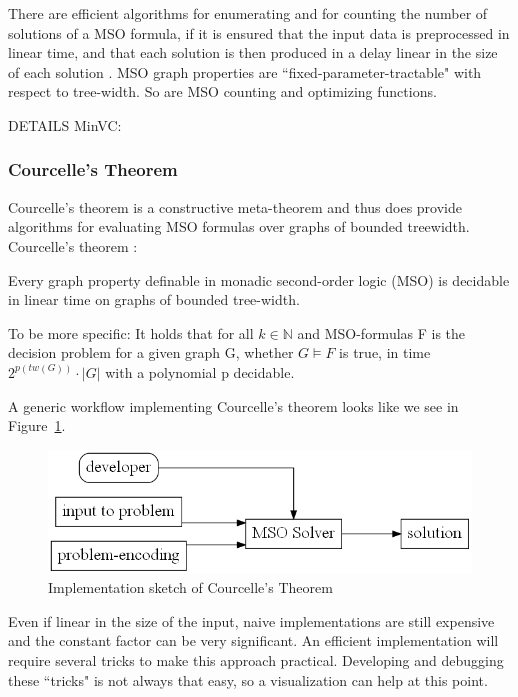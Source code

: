 \documentclass[a4paper, 12pt, bibliography=totoc]{scrartcl}
\begin{document}
There are efficient algorithms for enumerating and for counting the number of solutions of a MSO formula, if it is ensured that the input data is preprocessed in linear time, and that each solution is then produced in a delay linear in the size of each solution \cite{MSOQueriesGuillaume, ARNBORG1991308}.
MSO graph properties are ``fixed-parameter-tractable" with respect to tree-width. So are MSO counting and optimizing functions. \cite{CourcelleGROW}

DETAILS MinVC: 

\subsubsection{Courcelle's Theorem}
 Courcelle's theorem is a constructive meta-theorem and thus does provide algorithms for evaluating MSO formulas over graphs of bounded treewidth.
Courcelle's theorem \cite[p. 54]{Courcelle2012}:
\begin{thm}
	Every graph property definable in monadic second-order logic (MSO) is decidable in linear time on graphs of bounded tree-width. 

\end{thm}

\noindent
To be more specific: It holds that for all $k \in \mathbb{N}$ and MSO-formulas F is the decision problem for a given graph G, whether $G \models F$ is true, in time $2^{p(tw(G))} \cdot |G|$ with a polynomial p decidable.\smallskip 

\noindent
A generic workflow implementing Courcelle's theorem looks like we see in Figure~\ref{fig:UsageCourcelle}.
\begin{figure}[H]
	\includegraphics[height=0.2\textheight]{images/UsageCourcelle.gv.png}
	\caption{Implementation sketch of Courcelle's Theorem}
	\label{fig:UsageCourcelle}
\end{figure}

Even if linear in the size of the input, naive implementations are still expensive and 
the constant factor can be very significant. An efficient implementation will require several tricks to make this approach practical. Developing and debugging these ``tricks" is not always that easy, so a visualization can help at this point.\smallskip 
\end{document}
